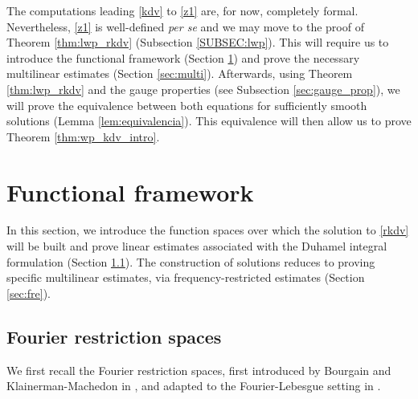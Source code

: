 \documentclass[a4paper,
11pt,  reqno]{amsart}
\newcommand{\5}{\textup{V}}
\theoremstyle{remark}
\numberwithin{equation}{section}
\numberwithin{theorem}{section}
\begin{document}
{
The computations leading \eqref{kdv} to \eqref{z1} are, for now, completely formal. Nevertheless, \eqref{z1} is well-defined \emph{per se} and we may move to the proof of Theorem \ref{thm:lwp_rkdv} (Subsection \ref{SUBSEC:lwp}). This will require us to introduce the functional framework (Section \ref{sec:functional}) and prove the necessary multilinear estimates (Section \ref{sec:multi}). Afterwards, using Theorem \ref{thm:lwp_rkdv} and the gauge properties (see Subsection \ref{sec:gauge_prop}), we will prove the equivalence between both equations for sufficiently smooth solutions (Lemma \ref{lem:equivalencia}). This equivalence will then allow us to prove Theorem \ref{thm:wp_kdv_intro}.
}



	\section{Functional framework}\label{sec:functional}
	
	In this section, we introduce the function spaces over which the solution to \eqref{rkdv} will be built and prove linear estimates associated with the Duhamel integral formulation (Section \ref{sec:fourier_restr}). The construction of solutions reduces to proving specific multilinear estimates, via frequency-restricted estimates (Section \ref{sec:fre}).
	
	
	\subsection{Fourier restriction spaces}\label{sec:fourier_restr}
	
	We first recall the Fourier restriction spaces, 
     first introduced by Bourgain \cite{bourg1, bourg2} and Klainerman-Machedon in \cite{KlainermanMachedon}, and adapted to the Fourier-Lebesgue setting in \cite{Grunrock_mkdv, HerrGrunrock_FL}.
	
		
		
\end{document}
